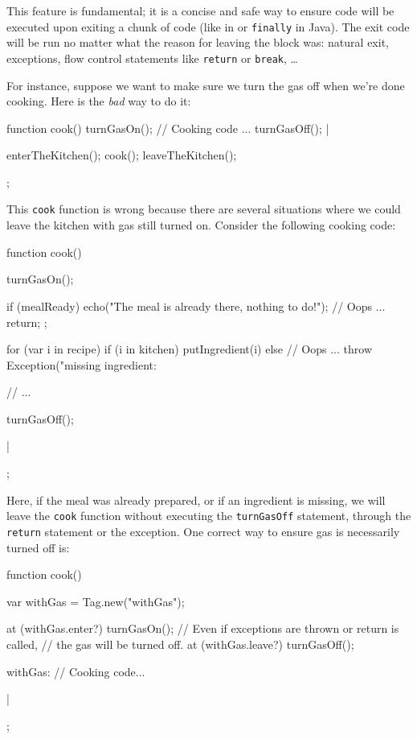 This feature is fundamental; it is a concise and safe way to ensure code
will be executed upon exiting a chunk of code (like  in \Cxx or
\lstinline|finally| in Java). The exit code will be run no matter what the
reason for leaving the block was: natural exit, exceptions, flow control
statements like \lstinline|return| or \lstinline|break|, \ldots

For instance, suppose we want to make sure we turn the gas off when
we're done cooking. Here is the \emph{bad} way to do it:

\begin{urbiscript}
{
  function cook()
  {
    turnGasOn();
    // Cooking code ...
    turnGasOff();
  }|

  enterTheKitchen();
  cook();
  leaveTheKitchen();
};
\end{urbiscript}

This \lstinline|cook| function is wrong because there are several situations
where we could leave the kitchen with gas still turned on. Consider the
following cooking code:

\begin{urbiscript}
{
  function cook()
  {
    turnGasOn();

    if (mealReady)
    {
      echo("The meal is already there, nothing to do!");
      // Oops ...
      return;
    };

    for (var i in recipe)
      if (i in kitchen)
        putIngredient(i)
      else
        // Oops ...
        throw Exception("missing ingredient: %

    // ...

    turnGasOff();
  }|
};
\end{urbiscript}

Here, if the meal was already prepared, or if an ingredient is missing, we
will leave the \lstinline|cook| function without executing the
\lstinline|turnGasOff| statement, through the \lstinline|return| statement
or the exception.  One correct way to ensure gas is necessarily turned off
is:

\begin{urbiscript}
{
  function cook()
  {
    var withGas = Tag.new("withGas");

    at (withGas.enter?)
      turnGasOn();
    // Even if exceptions are thrown or return is called,
    // the gas will be turned off.
    at (withGas.leave?)
      turnGasOff();

    withGas: {
      // Cooking code...
    }
  }|
};
\end{urbiscript}

